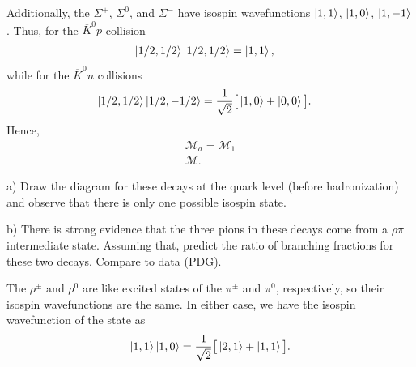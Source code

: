Additionally, the $\Sigma^{+}$, $\Sigma^{0}$, and $\Sigma^{-}$ have isospin wavefunctions $\ket{1,1}$, $\ket{1,0}$, $\ket{1,-1}$.
Thus, for the $\overline{K}^{0}p$ collision
\begin{align}
    \label{eq:rxn1}
    \ket{1/2,1/2}\ket{1/2,1/2} &= \ket{1,1}
,\end{align}
while for the $\overline{K}^{0}n$ collisions
\begin{align}
    \label{eq:rxn2-4}
    \ket{1/2,1/2}\ket{1/2,-1/2} &= \frac{1}{\sqrt{2}}\big[ \ket{1,0} + \ket{0,0} \big]
.\end{align}
Hence, 
\begin{align}
    \label{eq:amplitude-relations}
    \mathcal{M}_{a} = \mathcal{M}_{1} \\
    \mathcal{M}
.\end{align}



a) Draw the diagram for these decays at the quark level (before hadronization) and observe that there is only one possible isospin state.

b) There is strong evidence that the three pions in these decays come from a $\rho \pi$ intermediate state.
Assuming that, predict the ratio of branching fractions for these two decays.
Compare to data (PDG).

The $\rho^{\pm}$ and $\rho^{0}$ are like excited states of the $\pi^{\pm}$ and $\pi^{0}$, respectively, so their isospin wavefunctions are the same.
In either case, we have the isospin wavefunction of the state as
\begin{eqnarray}
    \label{eq:rho+-pi0}
    \ket{1,1}\ket{1,0} = \frac{1}{\sqrt{2}} \big[ \ket{2,1} + \ket{1,1} \big]
.\end{eqnarray}








